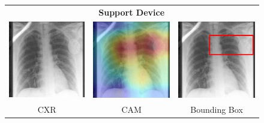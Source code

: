 \begin{figure}[htbp!]
\centering
\begin{tabular}{ccc}
 &\textbf{Support Device}& \\
\vspace{2mm}
  \includegraphics[width=35mm]{Tesi/images/CAMs/CAM3/image.png} &   
  \includegraphics[width=35mm]{Tesi/images/CAMs/CAM3/image_cam.png} &   
  \includegraphics[width=35mm]{Tesi/images/CAMs/CAM3/image_bbox.png} \\
\footnotesize{CXR} & \footnotesize{CAM} & \footnotesize{Bounding Box} \\[6pt]
\end{tabular}
\caption[Support Device CAM-3]{}
\label{fig:figure_5.17}
\end{figure}


